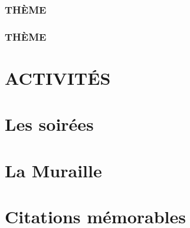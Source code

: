 \documentclass[poly,trombi]{valbonne}
\begin{document}
\subsection{THÈME}


\subsection{THÈME}



\chapter{ACTIVITÉS}


\chapter{\hspace{2mm}Les soirées}

\minitoc \clearpage














\chapter{La Muraille}


\newpage




\chapter{Citations mémorables}

\end{document}
